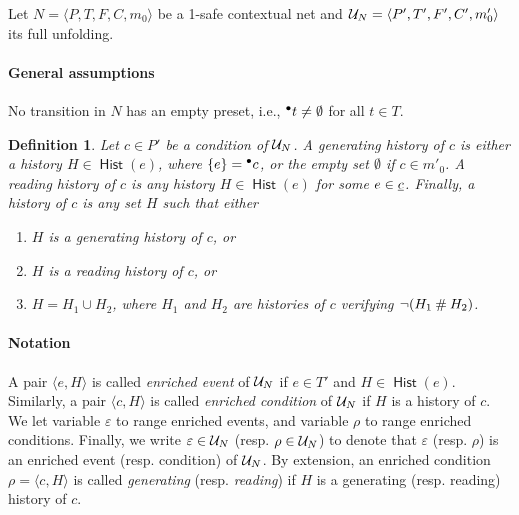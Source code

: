 \documentclass[12pt,a4paper]{article}
\newtheorem{definition}[theorem]{Definition}
\newcommand{\hist}[1]{\ensuremath{\mathop{\mathsf{Hist}}{(#1)}}}
\newcommand{\confl}{\ensuremath\mathbin\#}
\begin{document}



Let $N = \langle P, T, F, C, m_0 \rangle$ be a 1-safe contextual net and $\mathcal{U}_{N} = \langle P', T', F', C', m'_0 \rangle$ its full unfolding.

\paragraph{General assumptions}  No transition in $N$ has an empty preset,
i.e., ${}^\bullet t \ne \emptyset$ for all $t \in T$.

\begin{definition}
Let $c \in P'$ be a condition of $\mathcal{U}_{N}$.  A \emph{generating history} of $c$
is either a history $H \in \hist e$, where $\{e\} = {}^\bullet c$, or the empty set
$\emptyset$ if $c \in m'_0$.  A \emph{reading history} of $c$ is any history $H
\in \hist e$ for some $e \in \underline{c}$.  Finally, a \emph{history} of $c$ is any
set $H$ such that either
\begin{enumerate}
\item $H$ is a generating history of $c$, or
\item $H$ is a reading history of $c$, or
\item $H = H_1 \cup H_2$, where $H_1$ and $H_2$ are histories of $c$ verifying
$\lnot (H_1 \confl H_2)$.
\end{enumerate}
\end{definition}

\paragraph{Notation}  A pair $\langle e, H \rangle$ is called \emph{enriched
event} of $\mathcal{U}_{N}$ if $e \in T'$ and $H \in \hist e$.  Similarly, a pair
$\langle c, H \rangle$ is called \emph{enriched condition} of $\mathcal{U}_{N}$ if $H$
is a history of $c$.  We let variable $\varepsilon$ to range enriched events,
and variable $\rho$ to range enriched conditions.  Finally, we write
$\varepsilon \in \mathcal{U}_{N}$ (resp. $\rho \in \mathcal{U}_{N}$) to denote that $\varepsilon$
(resp. $\rho$) is an enriched event (resp. condition) of $\mathcal{U}_{N}$.  By
extension, an enriched condition $\rho = \langle c, H \rangle$ is called
\emph{generating} (resp. \emph{reading}) if $H$ is a generating (resp.
reading) history of $c$.
\end{document}
